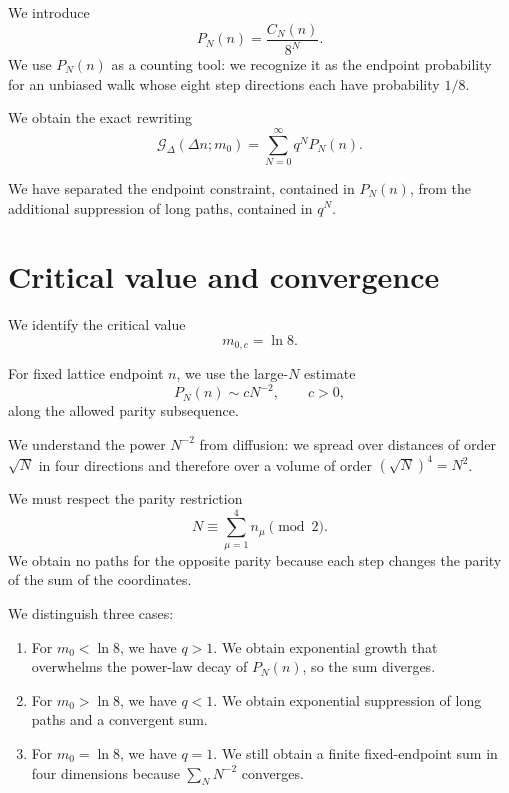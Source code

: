 \documentclass[11pt,a4paper]{article}
\numberwithin{equation}{section}
\begin{document}
We introduce
\begin{equation}
    P_N(n)=\frac{C_N(n)}{8^N}.
\end{equation}
We use $P_N(n)$ as a counting tool: we recognize it
as the endpoint probability for an unbiased walk
whose eight step directions each have probability
$1/8$.

We obtain the exact rewriting
\begin{equation}
    \boxed{
    \mathcal G_\Delta(\Delta n;m_0)
    =
    \sum_{N=0}^{\infty}q^NP_N(n).
    }
    \label{eq:walksum}
\end{equation}

We have separated the endpoint constraint, contained
in $P_N(n)$, from the additional suppression of long
paths, contained in $q^N$.

\section{Critical value and convergence}

We identify the critical value
\begin{equation}
    \boxed{m_{0,c}=\ln8.}
\end{equation}

For fixed lattice endpoint $n$, we use the large-$N$
estimate
\begin{equation}
    P_N(n)\sim cN^{-2},
    \qquad c>0,
\end{equation}
along the allowed parity subsequence.

We understand the power $N^{-2}$ from diffusion:
we spread over distances of order $\sqrt N$ in
four directions and therefore over a volume of
order $(\sqrt N)^4=N^2$.

We must respect the parity restriction
\begin{equation}
    N\equiv\sum_{\mu=1}^{4}n_\mu\pmod2.
\end{equation}
We obtain no paths for the opposite parity because
each step changes the parity of the sum of the
coordinates.

We distinguish three cases:
\begin{enumerate}
    \item For $m_0<\ln8$, we have $q>1$. We obtain
    exponential growth that overwhelms the
    power-law decay of $P_N(n)$, so the sum diverges.

    \item For $m_0>\ln8$, we have $q<1$. We obtain
    exponential suppression of long paths and a
    convergent sum.

    \item For $m_0=\ln8$, we have $q=1$. We still
    obtain a finite fixed-endpoint sum in four
    dimensions because $\sum_NN^{-2}$ converges.
\end{enumerate}
\end{document}
